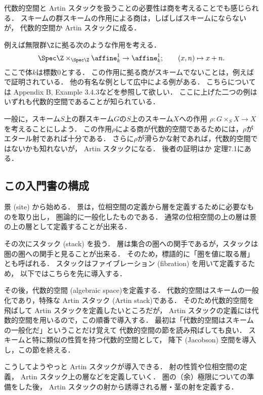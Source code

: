     代数的空間と Artin スタックを扱うことの必要性は商を考えることでも感じられる．
    スキームの群スキームの作用による商は，しばしばスキームにならないが，
    代数的空間か Artin スタックに成る．
    
    例えば無限群$\Z$に拠る次のような作用を考える．
    \[ \Spec \Z \times_{\Spec \Z} \affine^1_{k} \to \affine^1_{k}; \qquad (x, n) \mapsto x+n. \]
    ここで体$k$は標数$0$とする．
    この作用に拠る商がスキームでないことは，例えば\cite{Olsson16}で証明されている．
    他の有名な例として広中による例がある．
    こちらについては\cite{HarAG} Appendix B, Example 3.4.3などを参照して欲しい．
    ここに上げた二つの例はいずれも代数的空間であることが知られている．

    一般に，スキーム$S$上の群スキーム$G$の$S$上のスキーム$X$への作用
    $\rho \colon G \times_{S} X \to X$を考えることにしよう．
    この作用$\rho$による商が代数的空間であるためには，$\rho$がエタール射であれば十分である．
    さらに$\rho$が滑らかな射であれば，代数的空間ではないかも知れないが，
    Artin スタックになる．
    後者の証明は\cite{Olsson16}か\cite{SA18a} 定理7.1にある．

\subsection{この入門書の構成}
    景 (site) から始める．
    景は，位相空間の定義から層を定義するために必要なものを取り出し，
    圏論的に一般化したものである．
    通常の位相空間の上の層は景の上の層として定義することが出来る．

    その次にスタック (stack) を扱う．
    層は集合の圏への関手であるが，スタックは圏の圏への関手と見ることが出来る．
    そのため，標語的に「圏を値に取る層」とも呼ばれる．
    スタックはファイブレーション (fibration) を用いて定義するため，
    以下ではこちらを先に導入する．

    その後，代数的空間 (algebraic space)を定義する．
    代数的空間はスキームの一般化であり，特殊な Artin スタック (Artin stack)である．
    そのため代数的空間を飛ばして Artin スタックを定義したいところだが，
    Artin スタックの定義には代数的空間を用いるので，この順番で導入する．
    最初は「代数的空間はスキームの一般化だ」ということだけ覚えて
    代数的空間の節を読み飛ばしても良い．
    スキームと特に類似の性質を持つ代数的空間として，
    降下 (Jacobson) 空間を導入し，この節を終える．

    こうしてようやっと Artin スタックが導入できる．
    射の性質や位相空間の定義， Artin スタック上の層などを定義していく．
    圏の（余）極限についての準備をした後，
    Artin スタックの射から誘導される層・茎の射を定義する．

